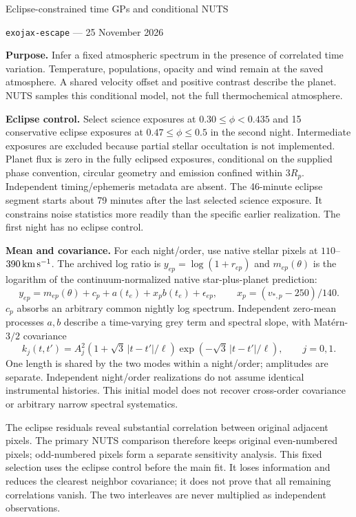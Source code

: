 \documentclass[10pt,a4paper]{article}
\begin{document}
\begin{center}
{\Large Eclipse-constrained time GPs and conditional NUTS}\par\vspace{4pt}
\texttt{exojax-escape} --- 25 November 2026
\end{center}
\textbf{Purpose.} Infer a fixed atmospheric spectrum in the presence of
correlated time variation. Temperature, populations, opacity and wind remain
at the saved atmosphere. A shared velocity offset and positive contrast
describe the planet. NUTS samples this conditional model, not the full
thermochemical atmosphere.

\textbf{Eclipse control.} Select science exposures at $0.30\leq\phi<0.435$
and 15 conservative eclipse exposures at $0.47\leq\phi\leq0.5$ in the second night.
Intermediate exposures are excluded because partial stellar occultation is
not implemented. Planet flux is zero in the fully eclipsed exposures,
conditional on the supplied phase convention, circular geometry and emission
confined within $3R_p$. Independent timing/ephemeris metadata are absent.
The 46-minute eclipse segment starts about 79 minutes after the last selected
science exposure. It constrains noise statistics more readily than the
specific earlier realization. The first night has no eclipse control.

\textbf{Mean and covariance.} For each night/order, use native stellar pixels
at $110$--$390\,{\rm km\,s^{-1}}$. The archived log ratio is
$y_{ep}=\log(1+r_{ep})$ and $m_{ep}(\theta)$ is the logarithm of the
continuum-normalized native star-plus-planet prediction:
\begin{equation}
y_{ep}=m_{ep}(\theta)+c_p+a(t_e)+x_p b(t_e)+\epsilon_{ep},\qquad
x_p=(v_{*,p}-250)/140.
\label{eq:mean}
\end{equation}
$c_p$ absorbs an arbitrary common nightly log spectrum. Independent
zero-mean processes $a,b$ describe a time-varying grey term and spectral
slope, with Mat\'ern-$3/2$ covariance
\begin{equation}
k_j(t,t')=A_j^2(1+\sqrt3\,|t-t'|/\ell)
                 \exp(-\sqrt3\,|t-t'|/\ell),\qquad j=0,1.
\label{eq:kernel}
\end{equation}
One length is shared by the two modes within a night/order; amplitudes are
separate. Independent night/order realizations do not assume identical
instrumental histories. This initial model does not recover cross-order
covariance or arbitrary narrow spectral systematics.

The eclipse residuals reveal substantial correlation between original adjacent
pixels. The primary NUTS comparison therefore keeps original even-numbered
pixels; odd-numbered pixels form a separate sensitivity analysis. This fixed
selection uses the eclipse control before the main fit. It loses information
and reduces the clearest neighbor covariance; it does not prove that all
remaining correlations vanish. The two interleaves are never multiplied as
independent observations.
\end{document}
